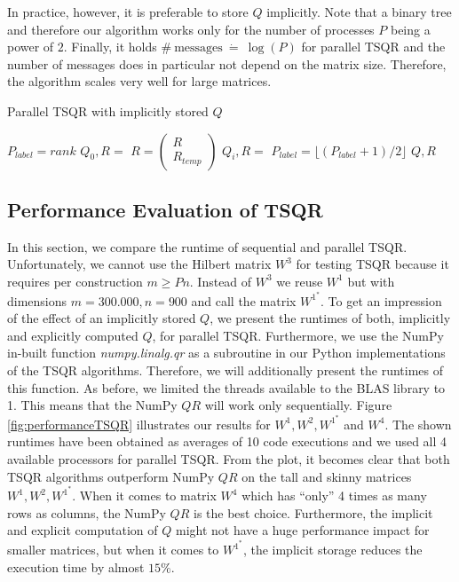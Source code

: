\documentclass{article}
\begin{document}
In practice, however, it is preferable to store $Q$ implicitly. Note that a
binary tree and therefore our algorithm works only for the number of processes
$P$ being a power of $2$. Finally, it holds $\# \ \text{messages} \ \dot{=} \
\log(P)$ for parallel TSQR and the number of messages does in particular not
depend on the matrix size. Therefore, the algorithm scales very well for large
matrices.
\begin{algorithm}[t]
    \caption{Parallel TSQR with implicitly stored $Q$} \label{tsqr:parallel}
    \begin{algorithmic}[1]
        \State {}
        \State $P_{label} = rank$
        \State $Q_0, R =$ 
                \State {}
                \State $R = \left(\begin{smallmatrix} R \\ R_{temp} \end{smallmatrix}\right)$
                \State $Q_i, R =$ \Call{QR}{$R$}
            \Else
                \State {}
                \State {}
            \EndIf
            \State $P_{label} = \lfloor (P_{label} + 1) / 2 \rfloor$
        \EndFor
        \State \Return $Q, R$
    \end{algorithmic}
\end{algorithm}

\subsection{Performance Evaluation of TSQR}

In this section, we compare the runtime of sequential and parallel TSQR.
Unfortunately, we cannot use the Hilbert matrix $W^3$ for testing TSQR because
it requires per construction $m \geq Pn$. Instead of $W^3$ we reuse $W^1$ but
with dimensions $m = 300.000, n = 900$ and call the matrix $W^{1^*}$. To get an
impression of the effect of an implicitly stored $Q$, we present the runtimes of
both, implicitly and explicitly computed $Q$, for parallel TSQR. Furthermore, we
use the NumPy in-built function \textit{numpy.linalg.qr} as a subroutine in our
Python implementations of the TSQR algorithms. Therefore, we will additionally
present the runtimes of this function. As before, we limited the threads
available to the BLAS library to 1. This means that the NumPy $QR$ will work
only sequentially. Figure \ref{fig:performanceTSQR} illustrates our results for
$W^1, W^2, W^{1^*}$ and $W^4$. The shown runtimes have been obtained as averages
of 10 code executions and we used all 4 available processors for parallel TSQR.
From the plot, it becomes clear that both TSQR algorithms outperform NumPy $QR$
on the tall and skinny matrices $W^1, W^2, W^{1^*}$. When it comes to matrix
$W^4$ which has \enquote{only} 4 times as many rows as columns, the NumPy $QR$
is the best choice. Furthermore, the implicit and explicit computation of $Q$
might not have a huge performance impact for smaller matrices, but when it comes
to $W^{1^*}$, the implicit storage reduces the execution time by almost $15\%$.
\end{document}
